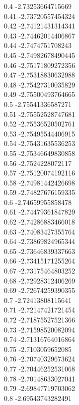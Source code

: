 {0.4	-2.73253664715669\\
0.41	-2.73720557454324\\
0.42	-2.74121431314341\\
0.43	-2.74462014406867\\
0.44	-2.7474751708243\\
0.45	-2.74982678490445\\
0.46	-2.75171809272356\\
0.47	-2.75318830632988\\
0.48	-2.75427310035829\\
0.49	-2.75500493764665\\
0.5	-2.75541336587271\\
0.51	-2.75552528747681\\
0.52	-2.75536520502761\\
0.53	-2.75495544406915\\
0.54	-2.75431635536253\\
0.55	-2.75346649830858\\
0.56	-2.7524228072117\\
0.57	-2.75120074192116\\
0.58	-2.74981442426698\\
0.59	-2.74827676159335\\
0.6	-2.74659955858478\\
0.61	-2.74479361847829\\
0.62	-2.74286883466018\\
0.63	-2.74083427355764\\
0.64	-2.73869824965344\\
0.65	-2.73646839337663\\
0.66	-2.73415171255264\\
0.67	-2.73175464803252\\
0.68	-2.72928312406269\\
0.69	-2.72674259390355\\
0.7	-2.72413808115641\\
0.71	-2.72147421721454\\
0.72	-2.71875527521366\\
0.73	-2.71598520082094\\
0.74	-2.71316764016864\\
0.75	-2.7103059652085\\
0.76	-2.70740329673624\\
0.77	-2.70446252531068\\
0.78	-2.70148633027041\\
0.79	-2.69847719703062\\
0.8	-2.69543743282491\\
}
